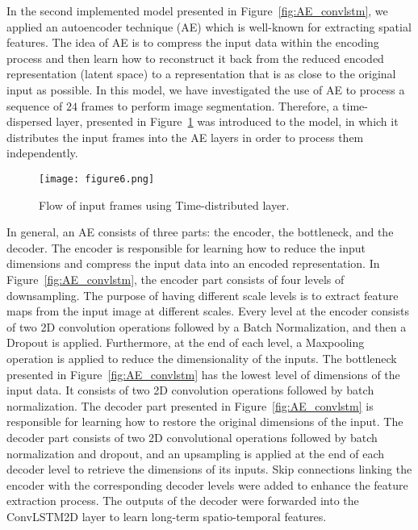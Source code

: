 In the second implemented model presented in Figure~\ref{fig:AE_convlstm}, we 
applied an autoencoder technique (AE) which is well-known for extracting 
spatial features.
The idea of AE is to compress the input data within the encoding process and then learn how to reconstruct it back from the reduced encoded representation (latent space) to a representation that is as close to the original input as possible. 
In this model, we have investigated the use of AE to process a sequence of \(24\) frames to perform image segmentation.
Therefore, a time-dispersed layer, presented in Figure~\ref{fig:TD} was 
introduced to the model, in which it distributes the input frames into the AE 
layers in order to process them independently.
\begin{figure}[!h]
	\centering
	\texttt{[image: figure6.png]}
	\caption{Flow of input frames using Time-distributed layer.}
	\label{fig:TD}
\end{figure}

In general, an AE consists of three parts: the encoder, the bottleneck, and the decoder.
The encoder is responsible for learning how to reduce the input dimensions and compress the input data into an encoded representation.
In Figure~\ref{fig:AE_convlstm}, the encoder part consists of four levels of 
downsampling. 
The purpose of having different scale levels is to extract feature maps from the input image at different scales.
Every level at the encoder consists of two 2D convolution operations followed by a Batch Normalization, and then a Dropout is applied.
Furthermore, at the end of each level, a Maxpooling operation is applied to reduce the dimensionality of the inputs. 
The bottleneck presented in Figure~\ref{fig:AE_convlstm} has the lowest level 
of dimensions of the input data.
It consists of two 2D convolution operations followed by batch normalization.
The decoder part presented in Figure~\ref{fig:AE_convlstm} is responsible for 
learning how to restore the original dimensions of the input.
The decoder part consists of two 2D convolutional operations followed by batch normalization and dropout, and an upsampling is applied at the end of each decoder level to retrieve the dimensions of its inputs.
Skip connections linking the encoder with the corresponding decoder levels were added to enhance the feature extraction process.
The outputs of the decoder were forwarded into the ConvLSTM2D layer to learn long-term spatio-temporal features.

